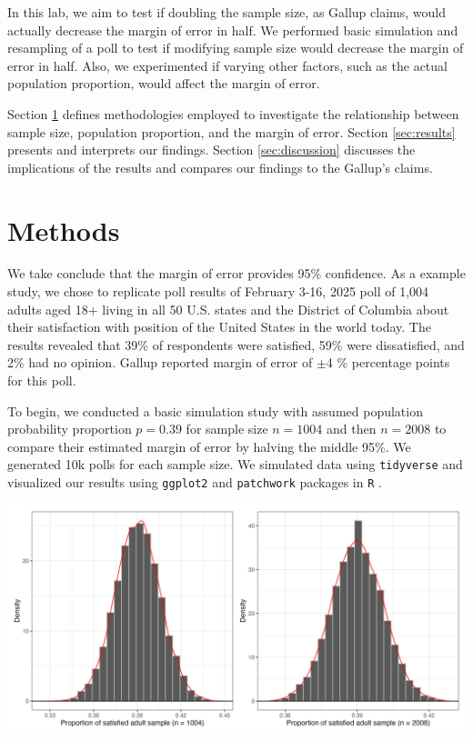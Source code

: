 \documentclass{article}\usepackage[]{graphicx}\usepackage[]{xcolor}
\newenvironment{Figure}
  {\par\medskip\noindent\minipage{\linewidth}}
  {\endminipage\par\medskip}
\begin{document}
\begin{multicols}{2}
In this lab, we aim to test if doubling the sample size, as Gallup claims, would actually decrease the margin of error in half. We performed basic simulation and resampling of a poll to test if modifying sample size would decrease the margin of error in half. Also, we experimented if varying other factors, such as the actual population proportion, would affect the margin of error.

Section \ref{sec:methods} defines methodologies employed to investigate the relationship between sample size, population proportion, and the margin of error. Section \ref{sec:results} presents and interprets our findings. Section \ref{sec:discussion} discusses the implications of the results and compares our findings to the Gallup's claims.



\section{Methods}\label{sec:methods}
We take conclude that the margin of error provides 95\% confidence. As a example study, we chose to replicate poll results of February 3-16, 2025 poll of 1,004 adults aged 18+ living in all 50 U.S. states and the District of Columbia about their satisfaction with position of the United States in the world today. The results revealed that 39\% of respondents were satisfied, 59\% were dissatisfied, and 2\% had no opinion. Gallup reported margin of error of  $\pm$4 \% percentage points for this poll.

To begin, we conducted a basic simulation study with assumed population probability proportion $p=0.39$ for sample size $n=1004$ and then $n=2008$ to compare their estimated margin of error by halving the middle 95\%. We generated 10k polls for each sample size. We simulated data using \texttt{tidyverse} and visualized our results using \texttt{ggplot2} and \texttt{patchwork} packages in \texttt{R} \citep{tidyverse, ggplot, patchwork}.

\begin{Figure} 
 \centering
 \includegraphics[width=\linewidth]{simulation.png}
 \label{fig:sim}
\end{Figure}


\end{multicols}
\end{document}
